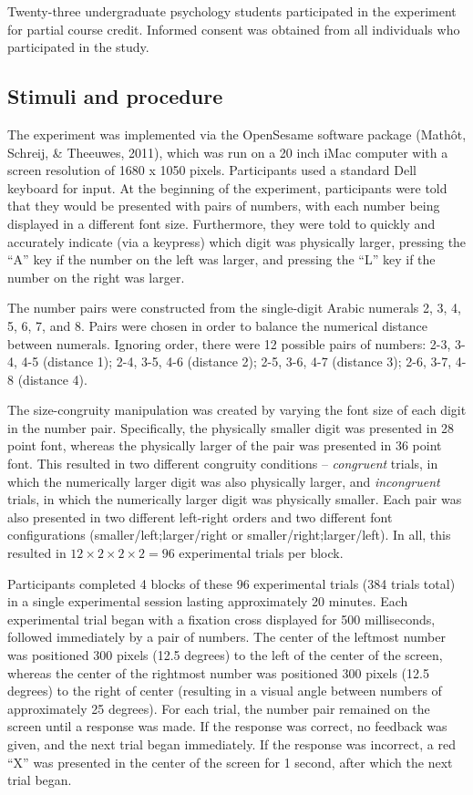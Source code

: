 \documentclass[english,,man]{apa6}
\theoremstyle{definition}
\theoremstyle{definition}
\theoremstyle{definition}
\theoremstyle{remark}
\begin{document}
Twenty-three undergraduate psychology students participated in the
experiment for partial course credit. Informed consent was obtained from
all individuals who participated in the study.

\hypertarget{stimuli-and-procedure}{%
\subsection{Stimuli and procedure}\label{stimuli-and-procedure}}

The experiment was implemented via the OpenSesame software package
(Mathôt, Schreij, \& Theeuwes, 2011), which was run on a 20 inch iMac
computer with a screen resolution of 1680 x 1050 pixels. Participants
used a standard Dell keyboard for input. At the beginning of the
experiment, participants were told that they would be presented with
pairs of numbers, with each number being displayed in a different font
size. Furthermore, they were told to quickly and accurately indicate
(via a keypress) which digit was physically larger, pressing the
\enquote{A} key if the number on the left was larger, and pressing the
\enquote{L} key if the number on the right was larger.

The number pairs were constructed from the single-digit Arabic numerals
2, 3, 4, 5, 6, 7, and 8. Pairs were chosen in order to balance the
numerical distance between numerals. Ignoring order, there were 12
possible pairs of numbers: 2-3, 3-4, 4-5 (distance 1); 2-4, 3-5, 4-6
(distance 2); 2-5, 3-6, 4-7 (distance 3); 2-6, 3-7, 4-8 (distance 4).

The size-congruity manipulation was created by varying the font size of
each digit in the number pair. Specifically, the physically smaller
digit was presented in 28 point font, whereas the physically larger of
the pair was presented in 36 point font. This resulted in two different
congruity conditions -- \emph{congruent} trials, in which the
numerically larger digit was also physically larger, and
\emph{incongruent} trials, in which the numerically larger digit was
physically smaller. Each pair was also presented in two different
left-right orders and two different font configurations
(smaller/left;larger/right or smaller/right;larger/left). In all, this
resulted in \(12 \times 2 \times 2 \times 2 = 96\) experimental trials
per block.

Participants completed 4 blocks of these 96 experimental trials (384
trials total) in a single experimental session lasting approximately 20
minutes. Each experimental trial began with a fixation cross displayed
for 500 milliseconds, followed immediately by a pair of numbers. The
center of the leftmost number was positioned 300 pixels (12.5 degrees)
to the left of the center of the screen, whereas the center of the
rightmost number was positioned 300 pixels (12.5 degrees) to the right
of center (resulting in a visual angle between numbers of approximately
25 degrees). For each trial, the number pair remained on the screen
until a response was made. If the response was correct, no feedback was
given, and the next trial began immediately. If the response was
incorrect, a red \enquote{X} was presented in the center of the screen
for 1 second, after which the next trial began.
\end{document}
